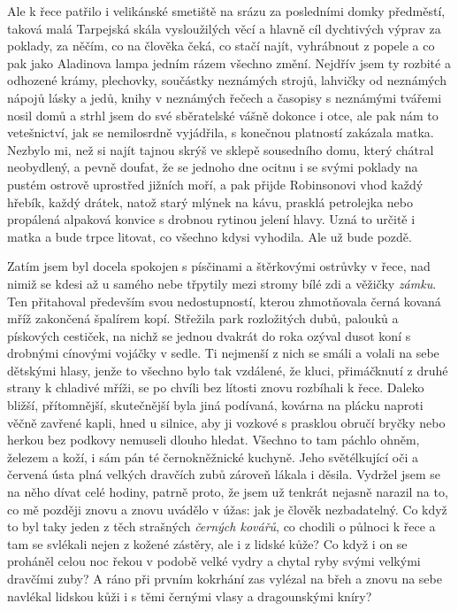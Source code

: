 Ale k řece patřilo i velikánské smetiště na srázu za posledními domky předměstí, taková malá Tarpejská skála vysloužilých věcí a hlavně cíl dychtivých výprav za poklady, za něčím, co na člověka čeká, co stačí najít, vyhrábnout z popele a co pak jako Aladinova lampa jedním rázem všechno změní. Nejdřív jsem ty rozbité a odhozené krámy, plechovky, součástky neznámých strojů, lahvičky od neznámých nápojů lásky a jedů, knihy v neznámých řečech a časopisy s neznámými tvářemi nosil domů a strhl jsem do své sběratelské vášně dokonce i otce, ale pak nám to vetešnictví, jak se nemilosrdně vyjádřila, s konečnou platností zakázala matka. Nezbylo mi, než si najít tajnou skrýš ve sklepě sousedního domu, který chátral neobydlený, a pevně doufat, že se jednoho dne ocitnu i se svými poklady na pustém ostrově uprostřed jižních moří, a pak přijde Robinsonovi vhod každý hřebík, každý drátek, natož starý mlýnek na kávu, prasklá petrolejka nebo propálená alpaková konvice s drobnou rytinou jelení hlavy. Uzná to určitě i matka a bude trpce litovat, co všechno kdysi vyhodila. Ale už bude pozdě.

Zatím jsem byl docela spokojen s písčinami a štěrkovými ostrůvky v řece, nad nimiž se kdesi až u samého nebe třpytily mezi stromy bílé zdi a věžičky \textit{zámku}. Ten přitahoval především svou nedostupností, kterou zhmotňovala černá kovaná mříž zakončená špalírem kopí. Střežila park rozložitých dubů, palouků a pískových cestiček, na nichž se jednou dvakrát do roka ozýval dusot koní s drobnými cínovými vojáčky v sedle. Ti nejmenší z nich se smáli a volali na sebe dětskými hlasy, jenže to všechno bylo tak vzdálené, že kluci, přimáčknutí z druhé strany k chladivé mříži, se po chvíli bez lítosti znovu rozbíhali k řece. Daleko bližší, přítomnější, skutečnější byla jiná podívaná, kovárna na plácku naproti věčně zavřené kapli, hned u silnice, aby ji vozkové s prasklou obručí bryčky nebo herkou bez podkovy nemuseli dlouho hledat. Všechno to tam páchlo ohněm, železem a koží, i sám pán té černokněžnické kuchyně. Jeho světélkující oči a červená ústa plná velkých dravčích zubů zároveň lákala i děsila. Vydržel jsem se na něho dívat celé hodiny, patrně proto, že jsem už tenkrát nejasně narazil na to, co mě později znovu a znovu uvádělo v úžas: jak je člověk nezbadatelný. Co když to byl taky jeden z těch strašných \textit{černých kovářů}, co chodili o půlnoci k řece a tam se svlékali nejen z kožené zástěry, ale i z lidské kůže? Co když i on se proháněl celou noc řekou v podobě velké vydry a chytal ryby svými velkými dravčími zuby? A ráno při prvním kokrhání zas vylézal na břeh a znovu na sebe navlékal lidskou kůži i s těmi černými vlasy a dragounskými kníry? 


